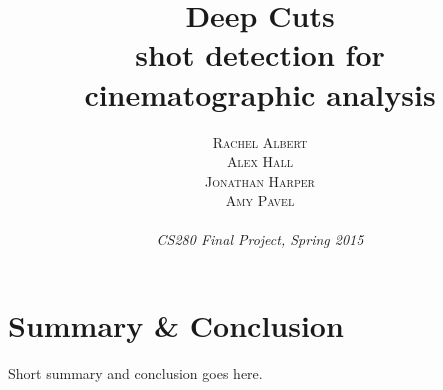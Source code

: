 \documentclass[a4paper, 9pt]{proc} %
\title{\textbf{Deep Cuts}\\ %
\Large{shot detection for \\cinematographic analysis}} %
\author{\textsc{Rachel Albert\\ Alex Hall\\ Jonathan Harper\\ Amy Pavel} %
\\{\textit{\\CS280 Final Project, Spring 2015}}} %
\makeatletter
\renewcommand{\maketitle}{ %
\begin{centering} %
{\huge\@title} %

\vspace{20pt} %

{\large\@author} %

\vspace{10pt} %
\end{centering}
}
\makeatother
\begin{document}
\maketitle %



%
%










\section*{Summary \& Conclusion}

Short summary and conclusion goes here.






\end{document}
